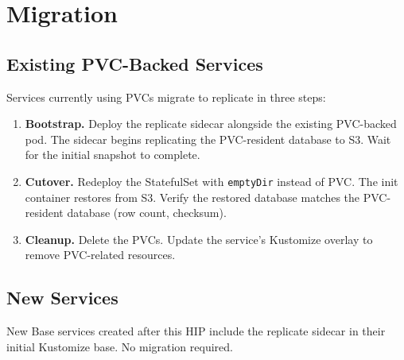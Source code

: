 \section{Migration}


\subsection{Existing PVC-Backed Services}

Services currently using PVCs migrate to replicate in three steps:

\begin{enumerate}[nosep]
    \item \textbf{Bootstrap.} Deploy the replicate sidecar alongside the
    existing PVC-backed pod. The sidecar begins replicating the PVC-resident
    database to S3. Wait for the initial snapshot to complete.

    \item \textbf{Cutover.} Redeploy the StatefulSet with \texttt{emptyDir}
    instead of PVC. The init container restores from S3. Verify the restored
    database matches the PVC-resident database (row count, checksum).

    \item \textbf{Cleanup.} Delete the PVCs. Update the service's Kustomize
    overlay to remove PVC-related resources.
\end{enumerate}

\subsection{New Services}

New Base services created after this HIP include the replicate sidecar in
their initial Kustomize base. No migration required.


